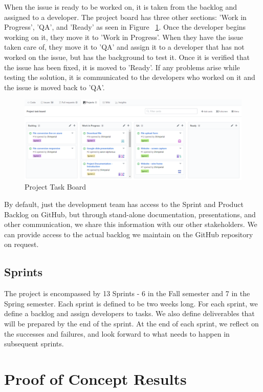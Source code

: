 When the issue is ready to be worked on, it is taken from the backlog and 
assigned to a developer. The project board has three other sections: 
'Work in Progress', 'QA', and 'Ready' as seen in Figure 
~\ref{fig:ProjectTaskBoard}. Once the developer begins working on it, 
they move it to 'Work in Progress'. When they have the issue taken care of, they
move it to 'QA' and assign it to a developer that has not worked on the issue, 
but has the background to test it. Once it is verified that the issue has been 
fixed, it is moved to 'Ready'. If any problems arise while testing the solution,
it is communicated to the developers who worked on it and the issue is moved 
back to 'QA'.

\begin{figure}[H]
    \centering
    \includegraphics[width=\textwidth]{ProjectTaskBoard.png}
    \caption{Project Task Board}
    \label{fig:ProjectTaskBoard}
\end{figure}

By default, just the development team has access to the Sprint and Product 
Backlog on GitHub, but through stand-alone documentation, presentations, and 
other communication, we share this information with our other stakeholders. 
We can provide access to the actual backlog we maintain on the GitHub repository
on request.

\subsection{Sprints}
The project is encompassed by 13 Sprints - 6 in the Fall semester and 7 in the 
Spring semester. Each sprint is defined to be two weeks long. 
For each sprint, we define a backlog and assign developers to tasks. We also 
define deliverables that will be prepared by the end of the sprint. At the end 
of each sprint, we reflect on the successes and failures, and look forward to 
what needs to happen in subsequent sprints.


\section{Proof of Concept Results}


